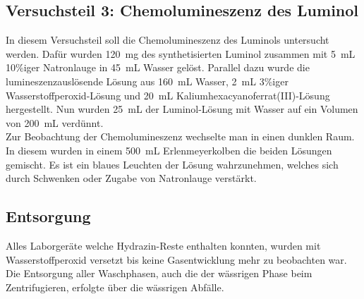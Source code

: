 \subsection*{Versuchsteil 3: Chemolumineszenz des Luminol}
In diesem Versuchsteil soll die Chemolumineszenz des Luminols untersucht werden. Dafür wurden \SI{120}{\milli \gram} des synthetisierten Luminol zusammen mit \SI{5}{\milli \liter} 10\%iger Natronlauge in \SI{45}{\milli \liter} Wasser gelöst. Parallel dazu wurde die lumineszenzauslösende Lösung aus \SI{160}{\milli \liter} Wasser, \SI{2}{\milli \liter} 3\%iger Wasserstoffperoxid-Lösung und \SI{20}{\milli \liter} Kaliumhexacyanoferrat(III)-Lösung hergestellt.
Nun wurden \SI{25}{\milli \liter} der Luminol-Lösung mit Wasser auf ein Volumen von \SI{200}{\milli \liter} verdünnt.\\
Zur Beobachtung der Chemolumineszenz wechselte man in einen dunklen Raum. In diesem wurden in einem \SI{500}{\milli \liter} Erlenmeyerkolben die beiden Lösungen gemischt. Es ist ein blaues Leuchten der Lösung wahrzunehmen, welches sich durch Schwenken oder Zugabe von Natronlauge verstärkt.

\subsection*{Entsorgung}
Alles Laborgeräte welche Hydrazin-Reste enthalten konnten, wurden mit Wasserstoffperoxid versetzt bis keine Gasentwicklung mehr zu beobachten war. Die Entsorgung aller Waschphasen, auch die der wässrigen Phase beim Zentrifugieren, erfolgte über die wässrigen Abfälle.